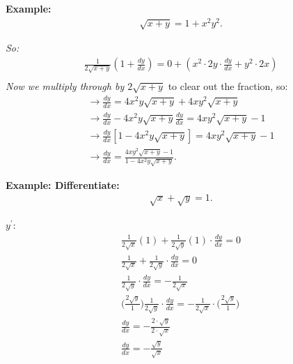 \documentclass{report}
\begin{document}
  \bigbreak \noindent 
  \begin{mdframed}
    \textbf{Example:}
    \begin{align*}
      \sqrt{x+y} = 1 + x^{2}y^{2}
    .\end{align*}
  \end{mdframed}
  \bigbreak \noindent
  \textit{So:}
  \begin{align*}
   \frac{1}{2\sqrt{x+y}} (1+\frac{dy}{dx}) = 0 + (x^{2}\cdot 2y \cdot \frac{dy}{dx} + y^{2}\cdot 2x) \\
  \end{align*}
  \bigbreak \noindent 
  \textit{Now we multiply through by $2\sqrt{x+y}$} to clear out the fraction, so:
  \begin{align*}
     \rightarrow \frac{dy}{dx} = 4x^{2}y\sqrt{x+y} + 4xy^{2}\sqrt{x+y} \\
    \rightarrow \frac{dy}{dx}-4x^{2}y\sqrt{x+y}\frac{dy}{dx} = 4xy^{2}\sqrt{x+y} -1 \\
    \rightarrow  \frac{dy}{dx} [1-4x^{2}y\sqrt{x+y}] = 4xy^{2}\sqrt{x+y} -1 \\
    \rightarrow \frac{dy}{dx} = \frac{4xy^{2}\sqrt{x+y} -1}{1-4x^{2}y\sqrt{x+y}}
  .\end{align*}

  \bigbreak \noindent 
  \begin{mdframed}
    \textbf{Example: Differentiate:}
    \begin{align*}
      \sqrt{x} + \sqrt{y} = 1
    .\end{align*}
  \end{mdframed}
  \bigbreak \noindent
  \textbf{\textit{\underline{$y^{\prime}$}}}:
  \begin{align*}
    \frac{1}{2\sqrt{x}}(1) + \frac{1}{2\sqrt{y}}(1)\cdot \frac{dy}{dx} = 0 \\
    \frac{1}{2\sqrt{x}} + \frac{1}{2\sqrt{y}}\cdot \frac{dy}{dx} = 0 \\
    \frac{1}{2\sqrt{y}}\cdot \frac{dy}{dx} = -\frac{1}{2\sqrt{x}} \\
    \bigg(\frac{2\sqrt{y}}{1} \bigg)\frac{1}{2\sqrt{y}}\cdot \frac{dy}{dx} = -\frac{1}{2\sqrt{x}} \cdot \bigg(\frac{2\sqrt{y}}{1}\bigg) \\
    \frac{dy}{dx} = -\frac{2\cdot \sqrt{y}}{2\cdot \sqrt{x}} \\
    \frac{dy}{dx} = -\frac{\sqrt{y}}{\sqrt{x}} \\
  \end{align*}
\end{document}
